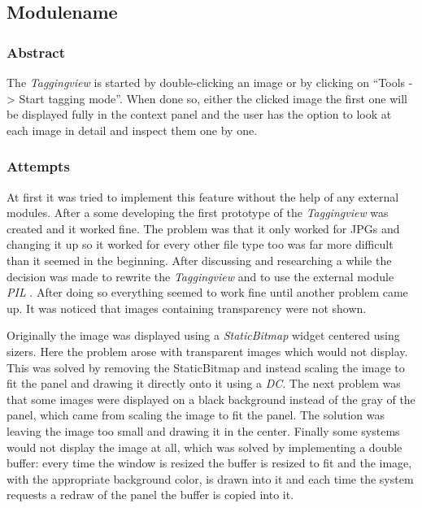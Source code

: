 \subsection{Modulename}
\def\kapitelautor{}

\subsubsection{Abstract}

The  \emph{Taggingview} is started by double-clicking an image or by clicking on ``Tools -> Start tagging mode''. When done so, either the clicked image the first one will be displayed fully in the context panel and the user has the option to look at each image in detail and inspect them one by one.

\subsubsection{Attempts}

At first it was tried to implement this feature without the help of any external modules. After a some developing the first prototype of the \emph{Taggingview} was created and it worked fine. The problem was that it only worked for JPGs and changing it up so it worked for every other file type too was far more difficult than it seemed in the beginning. After discussing and researching a while the decision was made to rewrite the \emph{Taggingview} and to use the external module \emph{PIL} \cite{PIL}. After doing so everything seemed to work fine until another problem came up. It was noticed that images containing transparency were not shown. 

Originally the image was displayed using a \emph{StaticBitmap} widget centered
using sizers. Here the problem arose with transparent images which would not
display. This was solved by removing the StaticBitmap and instead scaling the
image to fit the panel and drawing it directly onto it using a \emph{DC}. The
next problem was that some images were displayed on a black background instead
of the gray of the panel, which came from scaling the image to fit the panel.
The solution was leaving the image too small and drawing it in the center. Finally
some systems would not display the image at all, which was solved by
implementing a double buffer: every time the window is resized the buffer is
resized to fit and the image, with the appropriate background color, is drawn
into it and each time the system requests a redraw of the panel the buffer is
copied into it.

